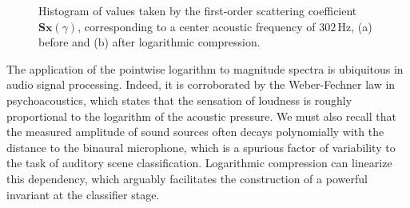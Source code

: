 \documentclass[journal]{IEEEtran}
\begin{document}
\begin{figure}
\begin{center}
\caption{
\label{fig:histograms}
Histogram of values taken by the first-order scattering coefficient $\mathbf{S}\boldsymbol{x}(\gamma)$, corresponding to a center acoustic frequency of $302\,\mathrm{Hz}$,
(a) before and (b) after logarithmic compression.}
\end{center}
\end{figure}


The application of the pointwise logarithm to magnitude spectra is ubiquitous in audio signal processing.
Indeed, it is corroborated by the Weber-Fechner law in psychoacoustics, which states that the sensation of loudness is roughly proportional to the logarithm of the acoustic pressure.
We must also recall that the measured amplitude of sound sources often decays polynomially with the distance to the binaural microphone, which is a spurious factor of variability to the task of auditory scene classification.
Logarithmic compression can linearize this dependency, which arguably facilitates the construction of a powerful invariant at the classifier stage.
\end{document}

